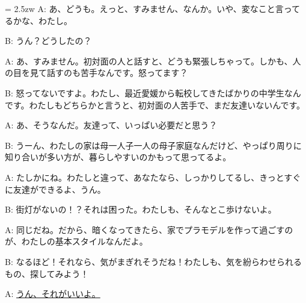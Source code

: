 \documentclass[11pt]{amsart}
\title{}
\author{}
\newenvironment{hangall}[1]{\hangindent = 2.5zw\everypar{\hangindent = 2.5zw}}{}
\begin{document}
\maketitle
\begin{hangall}{}%
A: あ、どうも。えっと、すみません、なんか。いや、変なこと言ってるかな、わたし。

B: うん？どうしたの？

A: あ、すみません。初対面の人と話すと、どうも緊張しちゃって。しかも、人の目を見て話すのも苦手なんです。怒ってます？

B: 怒ってないですよ。わたし、最近愛媛から転校してきたばかりの中学生なんです。わたしもどちらかと言うと、初対面の人苦手で、まだ友達いないんです。

A: あ、そうなんだ。友達って、いっぱい必要だと思う？

B: うーん、わたしの家は母一人子一人の母子家庭なんだけど、やっぱり周りに知り合いが多い方が、暮らしやすいのかもって思ってるよ。

A: たしかにね。わたしと違って、あなたなら、しっかりしてるし、きっとすぐに友達ができるよ、うん。

B: 街灯がないの！？それは困った。わたしも、そんなとこ歩けないよ。

A: 同じだね。だから、暗くなってきたら、家でプラモデルを作って過ごすのが、わたしの基本スタイルなんだよ。

B: なるほど！それなら、気がまぎれそうだね！わたしも、気を紛らわせられるもの、探してみよう！

A: \ul{うん、それがいいよ。}\end{hangall}
\end{document}
